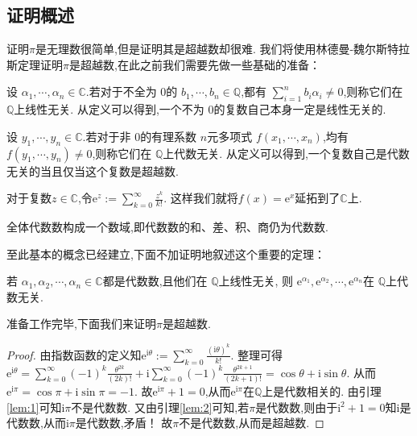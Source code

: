 \documentclass[main]{subfiles}
\begin{document}
\subsection{证明概述}
证明\(\pi\)是无理数很简单,但是证明其是超越数却很难.
我们将使用林德曼-魏尔斯特拉斯定理证明\(\pi\)是超越数,在此之前我们需要先做一些基础的准备：
\begin{defination}\label{def:2}
	设 \(\alpha_1,\cdots,\alpha_n \in \mathbb{C}\).若对于不全为 \(0\)的 \(b_1,\cdots,b_n \in \mathbb{Q}\),都有 \(\sum_{i=1}^{n} b_i \alpha_i \neq 0\),则称它们在 \(\mathbb{Q}\)上线性无关.
	从定义可以得到,一个不为 \(0\)的复数自己本身一定是线性无关的.

	设 \(y_1,\cdots,y_n \in \mathbb{C}\).若对于非 \(0\)的有理系数 \(n\)元多项式 \(f(x_1,\cdots,x_n)\),均有 \(f(y_1,\cdots,y_n) \neq 0\),则称它们在 \(\mathbb{Q}\)上代数无关.
	从定义可以得到,一个复数自己是代数无关的当且仅当这个复数是超越数.
\end{defination}
\begin{defination}\label{def:3}
	对于复数\(z \in \mathbb{C}\),令\(\mathrm{e}^z:=\sum_{k=0}^{\infty}\frac{z^k}{k!}\).
	这样我们就将\(f(x)=\mathrm{e}^x\)延拓到了\(\mathbb{C}\)上.
\end{defination}
\begin{lemma}\label{lem:2}
	全体代数数构成一个数域,即代数数的和、差、积、商仍为代数数.
\end{lemma}
至此基本的概念已经建立,下面不加证明地叙述这个重要的定理：
\begin{lemma}\label{lem:1}
	若 \(\alpha_1,\alpha_2,\cdots,\alpha_n \in \mathbb{C}\)都是代数数,且他们在 \(\mathbb{Q}\)上线性无关,
	则 \(\mathrm{e}^{\alpha_1},\mathrm{e}^{\alpha_2},\cdots,\mathrm{e}^{\alpha_n}\)在 \(\mathbb{Q}\)上代数无关.
\end{lemma}
准备工作完毕,下面我们来证明\(\pi\)是超越数.
\begin{proof}
	由指数函数的定义知\(\mathrm{e}^{\mathrm{i}\theta}:=\sum_{k=0}^{\infty}\frac{(\mathrm{i}\theta)^k}{k!}\).
	整理可得\(\mathrm{e}^{\mathrm{i}\theta}=\sum_{k=0}^{\infty}(-1)^k\frac{\theta^{2k}}{(2k)!}+\mathrm{i}\sum_{k=0}^{\infty}(-1)^k\frac{\theta^{2k +1}}{(2k +1)!}=\cos \theta + \mathrm{i} \sin \theta\).
	从而\(\mathrm{e}^{\mathrm{i}\pi}=\cos \pi + \mathrm{i}\sin \pi=-1\).
	故\(\mathrm{e}^{\mathrm{i}\pi}+1=0\),从而\(\mathrm{e}^{\mathrm{i}\pi}\)在\(\mathbb{Q}\)上是代数相关的.
	由引理\ref{lem:1}可知\(\mathrm{i}\pi\)不是代数数.
	又由引理\ref{lem:2}可知,若\(\pi\)是代数数,则由于\(\mathrm{i}^2+1=0\)知\(\mathrm{i}\)是代数数,从而\(\mathrm{i}\pi\)是代数数,矛盾！
	故\(\pi\)不是代数数,从而是超越数.
\end{proof}
\end{document}
